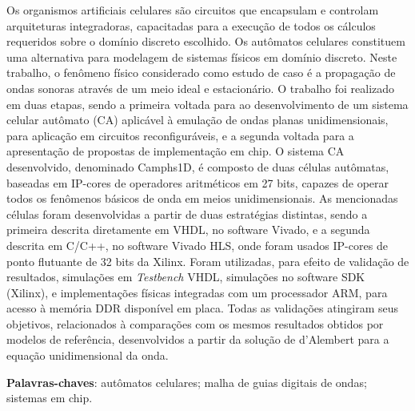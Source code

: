 \begin{resumo}

Os organismos artificiais celulares são circuitos que encapsulam e controlam arquiteturas integradoras, capacitadas para a execução de todos os cálculos requeridos sobre o domínio discreto escolhido. Os autômatos celulares constituem uma alternativa para modelagem de sistemas físicos em domínio discreto. Neste trabalho, o fenômeno físico considerado como estudo de caso é a propagação de ondas sonoras através de um meio ideal e estacionário. O trabalho foi realizado em duas etapas, sendo a primeira voltada para ao desenvolvimento de um sistema celular autômato (CA) aplicável à emulação de ondas planas unidimensionais, para aplicação em circuitos reconfiguráveis, e a segunda voltada para a apresentação de propostas de implementação em chip. O sistema CA desenvolvido, denominado Camphs1D, é composto de duas células autômatas, baseadas em IP-cores de operadores aritméticos em 27 bits, capazes de operar todos os fenômenos básicos de onda em meios unidimensionais. As mencionadas células foram desenvolvidas a partir de duas estratégias distintas, sendo a primeira descrita diretamente em VHDL, no software Vivado, e a segunda descrita em C/C++, no software Vivado HLS, onde foram usados IP-cores de ponto flutuante de 32 bits da Xilinx. Foram utilizadas, para efeito de validação de resultados, simulações em \textit{Testbench} VHDL, simulações no software SDK (Xilinx), e implementações físicas integradas com um processador ARM, para acesso à memória DDR disponível em placa. Todas as validações atingiram seus objetivos, relacionados à comparações com os mesmos resultados obtidos por modelos de referência, desenvolvidos a partir da solução de d'Alembert para a equação unidimensional da onda.

 \vspace{\onelineskip}
    
 \noindent
 \textbf{Palavras-chaves}: autômatos celulares; malha de guias digitais de ondas; sistemas em chip.
\end{resumo}
